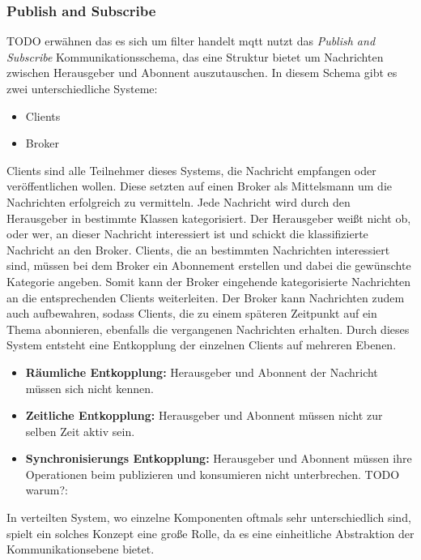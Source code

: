 \subsubsection{Publish and Subscribe}
TODO erwähnen das es sich um filter handelt
\ac{mqtt} nutzt das \textit{Publish and Subscribe} Kommunikationsschema, das eine Struktur bietet um Nachrichten zwischen Herausgeber und Abonnent auszutauschen. In diesem Schema gibt es zwei unterschiedliche Systeme:
\begin{itemize}
    \item Clients
    \item Broker
\end{itemize}
Clients sind alle Teilnehmer dieses Systems, die Nachricht empfangen oder veröffentlichen wollen. Diese setzten auf einen Broker als Mittelsmann um die Nachrichten erfolgreich zu vermitteln.\cite{teamGettingStartedMQTT} Jede Nachricht wird durch den Herausgeber in bestimmte Klassen kategorisiert. Der Herausgeber wei{\ss}t nicht ob, oder wer, an dieser Nachricht interessiert ist und schickt die klassifizierte Nachricht an den Broker. Clients, die an bestimmten Nachrichten interessiert sind, müssen bei dem Broker ein Abonnement erstellen und dabei die gewünschte Kategorie angeben. Somit kann der Broker eingehende kategorisierte Nachrichten an die entsprechenden Clients weiterleiten. Der Broker kann Nachrichten zudem auch aufbewahren, sodass Clients, die zu einem späteren Zeitpunkt auf ein Thema abonnieren, ebenfalls die vergangenen Nachrichten erhalten. Durch dieses System entsteht eine Entkopplung der einzelnen Clients auf mehreren Ebenen.\cite{EverythingYouNeed}
\begin{itemize}
    \item \textbf{Räumliche Entkopplung:} Herausgeber und Abonnent der Nachricht müssen sich nicht kennen.
    \item \textbf{Zeitliche Entkopplung:} Herausgeber und Abonnent müssen nicht zur selben Zeit aktiv sein.
    \item \textbf{Synchronisierungs Entkopplung:} Herausgeber und Abonnent müssen ihre Operationen beim publizieren und konsumieren nicht unterbrechen. TODO warum?:
\end{itemize}
\cite{teamPublishSubscribeMQTT}
In verteilten System, wo einzelne Komponenten oftmals sehr unterschiedlich sind, spielt ein solches Konzept eine gro{\ss}e Rolle, da es eine einheitliche Abstraktion der Kommunikationsebene bietet.\cite{domingusDistributedSystemsIntroduction2020}
